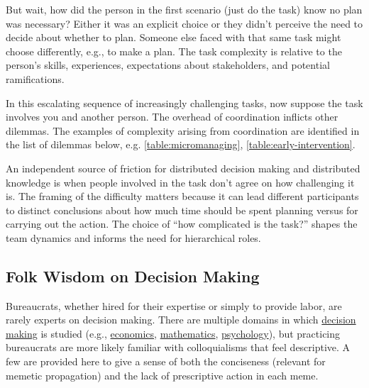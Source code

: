 But wait, how did the person in the first scenario (just do the task) know no plan was necessary? Either it was an explicit choice or they didn't perceive the need to decide about whether to plan. Someone else faced with that same task might choose differently, e.g., to make a plan. The task complexity is relative to the person's skills, experiences, expectations about stakeholders, and potential ramifications.

In this escalating sequence of increasingly challenging tasks, now suppose the task involves you and another person. The overhead of coordination inflicts other dilemmas. The examples of complexity arising from coordination are identified in the list of dilemmas below, e.g. \ref{table:micromanaging}, \ref{table:early-intervention}.

An independent source of friction for distributed decision making and distributed knowledge is when people involved in the task don't agree on how challenging it is. The framing of the difficulty matters because it can lead different participants to distinct conclusions about how much time should be spent planning versus for carrying out the action. The choice of ``how complicated is the task?'' shapes the team dynamics and informs the need for hierarchical roles. 

\subsection*{Folk Wisdom on Decision Making}

Bureaucrats, whether hired for their expertise or simply to provide labor, are rarely experts on decision making. There are multiple domains in which \href{https://en.wikipedia.org/wiki/Decision_theory}{decision making}
is studied (e.g., \href{https://en.wikipedia.org/wiki/Rational_choice_theory}{economics}, 
\href{https://en.wikipedia.org/wiki/Game_theory}{mathematics},
\href{https://en.wikipedia.org/wiki/Decision-making}{psychology}),
but practicing bureaucrats are more likely familiar with colloquialisms that feel descriptive. A few are provided here to give a sense of both the conciseness (relevant for memetic propagation) and the lack of prescriptive action in each meme.

